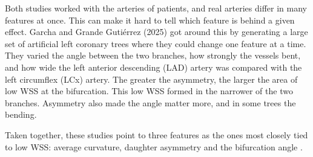 Both studies worked with the arteries of patients, and real arteries differ in many features at once.
This can make it hard to tell which feature is behind a given effect.
Garcha and Grande Guti\'errez (2025) \cite{garcha2025sensitivity} got around this by generating a
large set of artificial left coronary trees where they could change one feature at a time.
They varied the angle between the two branches, how strongly the vessels bent, and how wide the
left anterior descending (LAD) artery was compared with the left circumflex (LCx) artery. The greater the asymmetry, the larger the area of low WSS at the bifurcation.
This low WSS formed in the narrower of the two branches.
Asymmetry also made the angle matter more, and in some trees the bending.

Taken together, these studies point to three features as the ones most closely tied to low WSS:
average curvature, daughter asymmetry and the bifurcation angle
\cite{kashyap2022tortuosity,zhang2024curvature,garcha2025sensitivity}.
